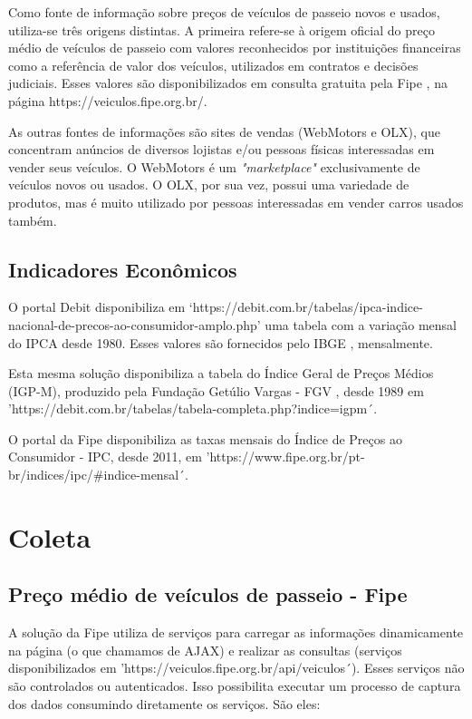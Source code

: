 \documentclass[conference]{IEEEtran}
\begin{document}
Como fonte de informação sobre preços de veículos de passeio novos e usados, utiliza-se três origens distintas. A primeira refere-se à origem oficial do preço médio de veículos de passeio com valores  reconhecidos por instituições financeiras como a referência de valor dos veículos, utilizados em contratos e decisões judiciais. Esses valores são disponibilizados em consulta gratuita pela Fipe \cite{Fipe}, na página https://veiculos.fipe.org.br/.  

As outras fontes de informações são sites de vendas (WebMotors e OLX), que concentram anúncios de diversos lojistas e/ou pessoas físicas interessadas em vender seus veículos. O WebMotors é um \textit{"marketplace"} exclusivamente de veículos novos ou usados. O OLX, por sua vez, possui uma variedade de produtos, mas é muito utilizado por pessoas interessadas em vender carros usados também.

\subsection{Indicadores Econômicos}

O portal Debit \cite{Debit} disponibiliza em  `https://debit.com.br/tabelas/ipca-indice-nacional-de-precos-ao-consumidor-amplo.php' uma tabela com a variação mensal do IPCA desde 1980. Esses valores são fornecidos pelo IBGE \cite{IBGE}, mensalmente.

Esta mesma solução disponibiliza a tabela do Índice Geral de Preços Médios (IGP-M), produzido pela Fundação Getúlio Vargas - FGV \cite{FGV}, desde 1989 em 'https://debit.com.br/tabelas/tabela-completa.php?indice=igpm´.

O portal da Fipe disponibiliza as taxas mensais do Índice de Preços ao Consumidor - IPC, desde 2011, em 'https://www.fipe.org.br/pt-br/indices/ipc/\#indice-mensal´.


\section{Coleta}

\subsection{Preço médio de veículos de passeio - Fipe}

A solução da Fipe utiliza de serviços para carregar as informações dinamicamente na página (o que chamamos de AJAX) e realizar as consultas (serviços disponibilizados em 'https://veiculos.fipe.org.br/api/veiculos´). Esses serviços não são controlados ou autenticados. Isso possibilita executar um processo de captura dos dados consumindo diretamente os serviços. São eles:
\end{document}
